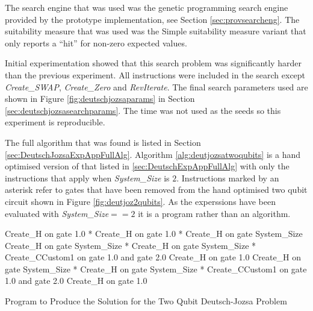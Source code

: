 The search engine that was used was the genetic programming search engine provided by the prototype implementation, see Section \ref{sec:provsearcheng}.
The suitability measure that was used was the Simple suitability measure variant that only reports a ``hit'' for non-zero expected values.

Initial experimentation showed that this search problem was significantly harder than the previous experiment.
All instructions were included in the search except \emph{Create\_SWAP}, \emph{Create\_Zero} and \emph{RevIterate}.
The final search parameters used are shown in Figure \ref{fig:deutschjozsaparams} in Section \ref{sec:deutschjozsasearchparams}.
The time was not used as the seeds so this experiment is reproducible.

The full algorithm that was found is listed in Section \ref{sec:DeutschJozsaExpAppFullAlg}.
Algorithm \ref{alg:deutjozsatwoqubits} is a hand optimised version of that listed in \ref{sec:DeutschExpAppFullAlg} with only the instructions that apply when \emph{System\_Size} is $2$.
Instructions marked by an asterisk refer to gates that have been removed from the hand optimised two qubit circuit shown in Figure \ref{fig:deutjoz2qubits}.
As the experssions have been evaluated with \emph{System\_Size}$==2$ it is a program rather than an algorithm.

\begin{algorithm}
 \begin{algorithmic}
\STATE Create\_H on gate 1.0 *
\STATE Create\_H on gate 1.0 *
\STATE Create\_H on gate System\_Size
\STATE Create\_H on gate System\_Size *
\STATE Create\_H on gate System\_Size *
\STATE Create\_CCustom1 on gate 1.0 and gate 2.0
\STATE Create\_H on gate 1.0
\STATE Create\_H on gate System\_Size *
\STATE Create\_H on gate System\_Size *
\STATE Create\_CCustom1 on gate 1.0 and gate 2.0
\STATE Create\_H on gate 1.0
 \end{algorithmic}
\caption{Program to Produce the Solution for the Two Qubit Deutsch-Jozsa Problem}
\label{alg:deutjozsatwoqubits}
\end{algorithm}


